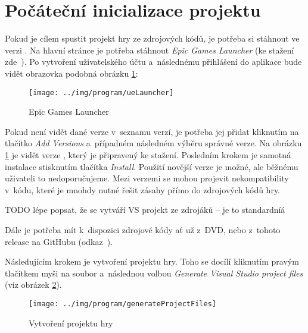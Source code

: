 
\section{Počáteční inicializace projektu}

Pokud je cílem spustit projekt hry ze zdrojových kódů, je potřeba si stáhnout \UE{} ve verzi . Na hlavní stránce \UE{} je potřeba stáhnout \textit{Epic Games Launcher} (ke stažení zde~\citep{ue_download}). Po vytvoření uživatelského účtu a~následnému přihlášení do aplikace bude vidět obrazovka podobná obrázku \ref{fig:ueLauncher}:


\begin{figure}[!ht]\centering
\texttt{[image: ../img/program/ueLauncher]}

\caption{Epic Games Launcher}
\label{fig:ueLauncher}

\end{figure}

\FloatBarrier

Pokud není vidět \UE{} dané verze v~seznamu verzí, je potřeba jej přidat kliknutím na tlačítko \textit{Add Versions} a~případném následném výběru správné verze. Na obrázku \ref{fig:ueLauncher} je vidět \UE{} verze , který je připravený ke stažení. Posledním krokem je samotná instalace stisknutím tlačítka \textit{Install}. Použití novější verze \UEu{} je možné, ale běžnému uživateli to nedoporučujeme. Mezi verzemi se mohou projevit nekompatibility v~kódu, které je mnohdy nutné řešit zásahy přímo do zdrojových kódů hry.

TODO lépe popsat, že se vytváří VS projekt ze zdrojáků -- je to standardníá

Dále je potřeba mít k~dispozici zdrojové kódy ať už z~DVD, nebo z~tohoto release na GitHubu (odkaz~\citep{gh_finalRelease}).
 
Následujícím krokem je vytvoření projektu hry. Toho se docílí kliknutím pravým tlačítkem myši na soubor  a~následnou volbou \textit{Generate Visual Studio project files} (viz obrázek \ref{fig:generateProjectFiles}). 

\begin{figure}[!ht]\centering
\texttt{[image: ../img/program/generateProjectFiles]}

\caption{Vytvoření projektu hry}
\label{fig:generateProjectFiles}

\end{figure}


